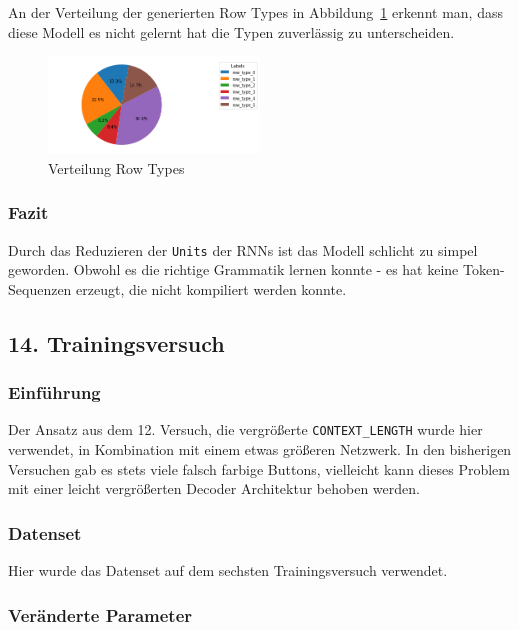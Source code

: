 \documentclass[pdftex,a4paper,halfparskip, article]{scrartcl}
\begin{document}
An der Verteilung der generierten Row Types in Abbildung~\ref{fig:bin16_row_type} erkennt man, dass diese Modell es nicht gelernt hat die Typen zuverlässig zu unterscheiden.

\begin{figure}[h]
\centering
\includegraphics[width=0.5\textwidth]{predictions_bin16_predicted_row_type_distribution}
\caption{Verteilung Row Types}
\label{fig:bin16_row_type}
\end{figure}

\subsubsection*{Fazit}
Durch das Reduzieren der \texttt{Units} der RNNs ist das Modell schlicht zu simpel geworden. Obwohl es die richtige Grammatik lernen konnte - es hat keine Token-Sequenzen erzeugt, die nicht kompiliert werden konnte.

\subsection{14. Trainingsversuch}

\subsubsection*{Einführung}

Der Ansatz aus dem 12. Versuch, die vergrößerte \texttt{CONTEXT\_LENGTH} wurde hier verwendet, in Kombination mit einem etwas größeren Netzwerk. In den bisherigen Versuchen gab es stets viele falsch farbige Buttons, vielleicht kann dieses Problem mit einer leicht vergrößerten Decoder Architektur behoben werden.

\subsubsection*{Datenset}

Hier wurde das Datenset auf dem sechsten Trainingsversuch verwendet.

\subsubsection*{Veränderte Parameter}
\end{document}

